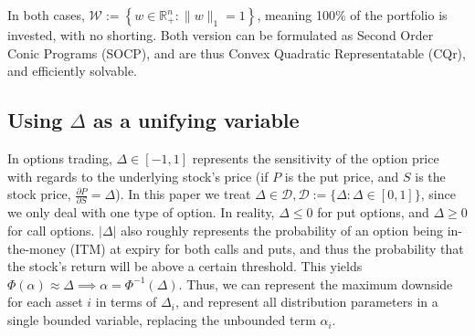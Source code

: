 \documentclass[11pt]{article}
\newcommand{\R}{\mathbb{R}}
\newcommand{\lb}{\left\{}
\newcommand{\rb}{\right\}}
\newcommand{\D}{\Delta}
\begin{document}
In both cases, $\mathcal{W} := \lb w\in \R^n_+: \|w\|_1 =1\rb$, meaning 100\% of the portfolio is invested, with no shorting. Both version can be formulated as Second Order Conic Programs (SOCP), and are thus Convex Quadratic Representatable (CQr), and efficiently solvable.

\subsection{Using $\Delta$ as a unifying variable}

In options trading, $\Delta \in [-1 , 1]$ represents the sensitivity of the option price with regards to the underlying stock's price (if $P$ is the put price, and $S$ is the stock price, $\frac{\partial P}{\partial S} = \Delta$). In this paper we treat $\Delta \in \mathcal{D}, \mathcal{D} := \{\Delta: \Delta \in [0, 1]\}$, since we only deal with one type of option. In reality, $\Delta \leq0$ for put options, and $\D \geq 0$ for call options. $|\Delta|$ also roughly represents the probability of an option being in-the-money (ITM) at expiry for both calls and puts, and thus the probability that the stock's return will be above a certain threshold. This yields $\Phi\left(\alpha\right) \approx \Delta \implies \alpha = \Phi^{-1}(\Delta)$.  Thus, we can represent the maximum downside for each asset $i$ in terms of $\Delta_i$, and represent all distribution parameters in a single bounded variable, replacing the unbounded term $\alpha_i$.
\end{document}
